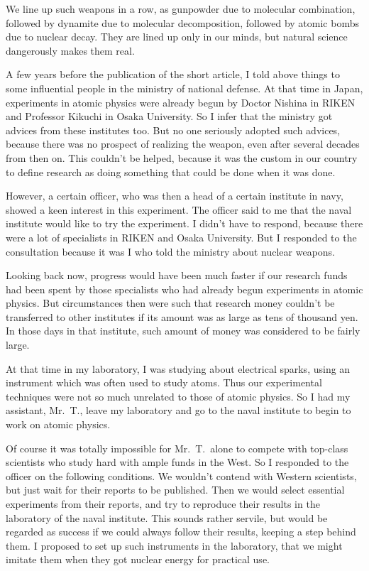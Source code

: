 \documentclass[11pt,a4j,twocolumn]{jarticle}
\begin{document}
We line up such weapons in a row, as
gunpowder due to molecular combination,
followed by dynamite due to molecular decomposition,
followed by atomic bombs due to nuclear decay.
They are lined up only in our minds, 
but natural science dangerously makes them real.

A few years before the publication of the short article,
I told above things to some influential people in the ministry of national defense.
At that time in Japan, experiments in atomic physics were already begun
by Doctor Nishina in RIKEN and Professor Kikuchi in Osaka University.
So I infer that the ministry got advices from these institutes too.
But no one seriously adopted such advices, because there was no
prospect of realizing the weapon, even after several decades from then on.
This couldn't be helped, because it was the custom in our country
to define research as doing something that could be done when it was done.

However, a certain officer, who was then a head of a certain institute in navy,
showed a keen interest in this experiment. The officer said to me that
the naval institute would like to try the experiment.
I didn't have to respond, because
there were a lot of specialists in RIKEN and Osaka University. 
But I responded to the consultation because it was I who told
the ministry about nuclear weapons.

Looking back now, progress would have been much faster if
our research funds had been spent by those specialists
who had already begun experiments in atomic physics.
But circumstances then were such that research money couldn't
be transferred to other institutes if its amount was as large as tens of thousand yen.
In those days in that institute, such amount of money was considered
to be fairly large.

At that time in my laboratory, I was studying about electrical sparks,
using an instrument which was often used to study atoms.
Thus our experimental techniques were not so much unrelated to those of atomic physics.
So I had my assistant, Mr.\ T., leave my laboratory and go to the naval institute
to begin to work on atomic physics.

Of course it was totally impossible for Mr.\ T.\ alone to compete with 
top-class scientists who study hard with ample funds in the West.
So I responded to the officer on the following conditions.
We wouldn't contend with Western scientists, but just wait for their reports to be published.
Then we would select essential experiments from their reports, 
and try to reproduce their results in the laboratory of the naval institute.
This sounds rather servile, but would be regarded as success if
we could always follow their results, keeping a step behind them.
I proposed to set up such instruments in the laboratory, that
we might imitate them when they got nuclear energy for practical use.
\end{document}
